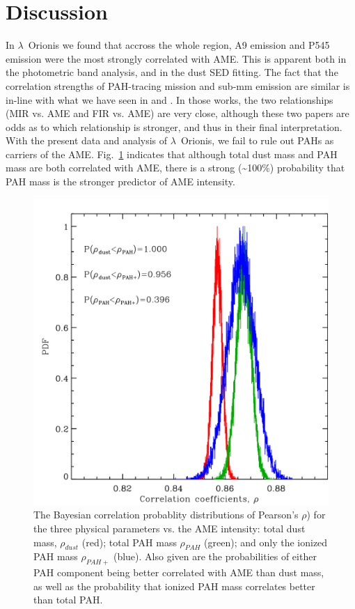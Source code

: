  \section{Discussion}
  \label{sec:lori_discussion}
      In  $\lambda$~Orionis we found that accross the whole region, A9 emission and P545 emission were the most strongly correlated with AME. This is apparent both in the photometric band analysis, and in the dust SED fitting.  The fact that the correlation strengths of PAH-tracing mission and sub-mm emission are similar is in-line with what we have seen in \cite{ysard10b} and \cite{hensley16}. In those works, the two relationships (MIR vs. AME and FIR vs. AME) are very close, although these two papers are odds as to which relationship is stronger, and thus in their final interpretation. With the present data and analysis of $\lambda$~Orionis, we fail to rule out PAHs as carriers of the AME. Fig.~\ref{fig:fred_LOri_notes_Oct2017_fig2c} indicates that although total dust mass and PAH mass are both correlated with AME, there is a strong (\textasciitilde{}100\%) probability that PAH mass is the stronger predictor of AME intensity.
          \begin{figure}
            \includegraphics[width=\textwidth]{../Plots/ch_lori/fred_LOri_notes_Oct2017_fig2c.pdf}
            \centering
            \caption{ The Bayesian correlation probablity distributions of Pearson's $\rho{}$) for the three physical parameters vs. the AME intensity: total dust mass, $\rho_{dust}$ (red); total PAH mass $\rho_{PAH}$ (green); and only the ionized PAH mass $\rho_{PAH+}$ (blue). Also given are the probabilities of either PAH component being better correlated with AME than dust mass, as well as the probability that ionized PAH mass correlates better than total PAH.}
            \label{fig:fred_LOri_notes_Oct2017_fig2c}
          \end{figure}
